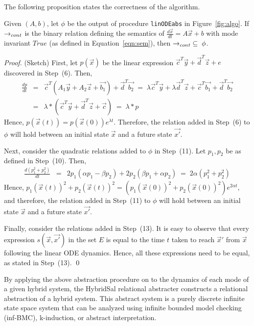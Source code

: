 \documentclass{llncs}
\def\linODEabs{\tt{linODEabs}}
\newcommand\ignore[1]{{}}
\begin{document}
The following proposition states the correctness of the algorithm.
\begin{proposition}\label{prop:corr}
Given $(A,b)$, let $\phi$ be the output of 
procedure {\linODEabs} in
Figure~\ref{fig:algo}.
If $\rightarrow_{cont}$ is the binary relation defining the
semantics of $\frac{d\vec{x}}{dt} = A\vec{x}+b$ 
with mode invariant $\mathit{True}$
(as defined in Equation~\ref{eqn:sem}), then
$\rightarrow_{cont}  \;\subseteq\; \phi$.
\end{proposition}
\begin{proof}(Sketch)
First, let $p(\vec{x})$ be the linear expression
$\vec{c}^T\vec{y}+\vec{d}^T\vec{z}+e$ discovered in Step~(6).
Then,
\begin{eqnarray*}
\frac{dp}{dt} &=& \vec{c}^T(A_1\vec{y}+A_2\vec{z}+\vec{b_1}) +
 \vec{d}^T\vec{b_2}
\; = \; \lambda\vec{c}^T\vec{y}+\lambda\vec{d}^T\vec{z}+\vec{c}^T\vec{b_1} + \vec{d}^T\vec{b_2}
\\
& = & \lambda*(\vec{c}^T\vec{y}+\vec{d}^T\vec{z}+\vec{c})
\; = \; \lambda*p
\end{eqnarray*}
Hence, $p(\vec{x}(t)) = p(\vec{x}(0)) e^{\lambda t}$.
Therefore, the relation added in Step~(6) to $\phi$ 
will hold between an initial state $\vec{x}$ and a future
state $\vec{x'}$.

Next, consider the quadratic relations added to $\phi$ 
in Step~(11).  Let $p_1,p_2$ be as defined in Step~(10).
Then,
\begin{eqnarray*}
\frac{d(p_1^2+p_2^2)}{dt} 
& = &
 2p_1(\alpha p_1-\beta p_2)+2p_2(\beta p_1+\alpha p_2)
\; = \;
 2\alpha(p_1^2 + p_2^2)
\end{eqnarray*}
Hence, 
$p_1(\vec{x}(t))^2+p_2(\vec{x}(t))^2 = 
 (p_1(\vec{x}(0))^2+p_2(\vec{x}(0))^2) e^{2\alpha t}$,
and therefore, the relation added in Step~(11) to $\phi$
will hold between an initial state $\vec{x}$ and a future
state $\vec{x'}$.

Finally, consider the relations added in Step~(13).
It is easy to observe that every expression $s(\vec{x},\vec{x'})$ 
in the set $E$ is equal to the time $t$ taken to reach $\vec{x}'$
from $\vec{x}$ following the linear ODE dynamics.
Hence, all these expressions need to be equal, as stated in Step~(13).
\qed
\end{proof}

By applying the above abstraction procedure on to the
dynamics of each mode of a given hybrid system,
the HybridSal relational abstracter constructs  a
relational abstraction of a hybrid system.
This abstract system is a purely discrete 
infinite state space system that can be analyzed
using infinite bounded model checking (inf-BMC), 
k-induction, or abstract interpretation.
\end{document}
